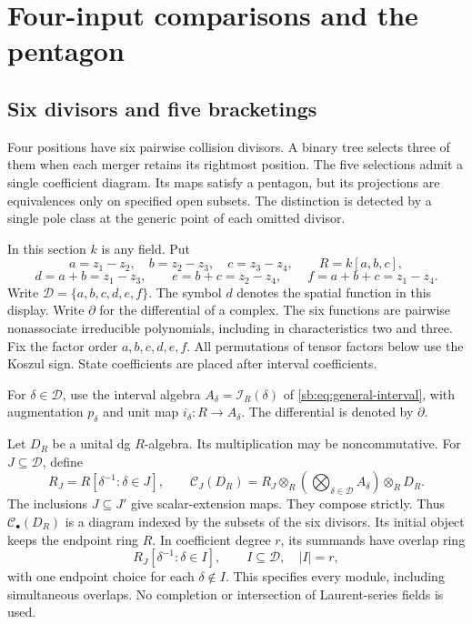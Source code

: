 \section{Four-input comparisons and the pentagon}
\label{sec:four-leaf-pentagon}

\subsection{Six divisors and five bracketings}
\label{fp:sec:four-divisors}

Four positions have six pairwise collision divisors.  A binary tree
selects three of them when each merger retains its rightmost position.
The five selections admit a single coefficient diagram.  Its maps
satisfy a pentagon, but its projections are equivalences only on
specified open subsets.  The distinction is detected by a single pole
class at the generic point of each omitted divisor.

In this section \(k\) is any field.  Put
\[
 a=z_1-z_2,\quad b=z_2-z_3,\quad c=z_3-z_4,\qquad R=k[a,b,c],
\]
\[
 d=a+b=z_1-z_3,\qquad e=b+c=z_2-z_4,\qquad
 f=a+b+c=z_1-z_4.
\]
Write \(\mathcal D=\{a,b,c,d,e,f\}\).
The symbol \(d\) denotes the spatial function in this display.
Write \(\partial\) for the differential of a complex.
The six functions are pairwise nonassociate irreducible polynomials,
including in characteristics two and three.  Fix the factor order
\(a,b,c,d,e,f\).  All permutations of tensor factors below use the
Koszul sign.  State coefficients are placed after interval coefficients.

For \(\delta\in\mathcal D\), use the interval algebra
\(A_\delta=\mathcal I_R(\delta)\) of
\eqref{sb:eq:general-interval}, with augmentation \(p_\delta\)
and unit map \(i_\delta:R\to A_\delta\).
The differential is denoted by \(\partial\).

Let \(D_R\) be a unital dg \(R\)-algebra.  Its multiplication
may be noncommutative.  For \(J\subseteq\mathcal D\), define
\begin{equation}\label{fp:eq:four-common-carrier}
 R_J=R[\delta^{-1}:\delta\in J],\qquad
 \mathcal C_J(D_R)=R_J\otimes_R
       \left(\bigotimes_{\delta\in\mathcal D}A_\delta\right)
       \otimes_R D_R.
\end{equation}
The inclusions \(J\subseteq J'\) give scalar-extension maps.
They compose strictly.  Thus \(\mathcal C_\bullet(D_R)\)
is a diagram indexed by the subsets of the six divisors.
Its initial object keeps the endpoint ring \(R\).
In coefficient degree \(r\), its summands have overlap ring
\[
 R_J[\delta^{-1}:\delta\in I],\qquad
 I\subseteq\mathcal D,\quad |I|=r,
\]
with one endpoint choice for each \(\delta\notin I\).
This specifies every module, including simultaneous overlaps.
No completion or intersection of Laurent-series fields is used.

